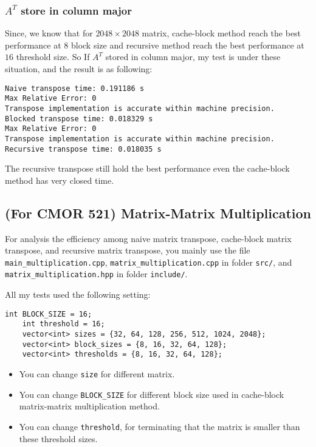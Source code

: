 \documentclass[11pt]{article}
\begin{document}
\subsubsection{$A^T$ store in column major}
Since, we know that for $2048 \times 2048$ matrix, cache-block method reach the best performance at $8$ block size and recursive method reach the best performance at $16$ threshold size. So If $A^T$ stored in column major, my test is under these situation, and the result is as following:
\begin{lstlisting}[style=C++Style]
Naive transpose time: 0.191186 s
Max Relative Error: 0
Transpose implementation is accurate within machine precision.
Blocked transpose time: 0.018329 s
Max Relative Error: 0
Transpose implementation is accurate within machine precision.
Recursive transpose time: 0.018035 s
\end{lstlisting}
The recursive transpose still hold the best performance even the cache-block method has very closed time.

\newpage

\subsection{(For CMOR 521)  Matrix-Matrix Multiplication}
For analysis the efficiency among naive matrix transpose, cache-block matrix transpose, and recursive matrix transpose, you mainly use the file \verb|main_multiplication.cpp|, \verb|matrix_multiplication.cpp| in folder \texttt{src/}, and \verb|matrix_multiplication.hpp| in folder \texttt{include/}.

All my tests used the following setting:

\begin{lstlisting}[style=C++Style]
    int BLOCK_SIZE = 16;  
    int threshold = 16; 
    vector<int> sizes = {32, 64, 128, 256, 512, 1024, 2048};
    vector<int> block_sizes = {8, 16, 32, 64, 128};
    vector<int> thresholds = {8, 16, 32, 64, 128};
\end{lstlisting}
\begin{itemize}
    \item You can change \verb|size| for different matrix.
    \item You can change \verb|BLOCK_SIZE| for different block size used in cache-block matrix-matrix multiplication method.
    \item You can change \verb|threshold|, for terminating that the matrix is smaller than these threshold sizes. 
\end{itemize}
\end{document}
